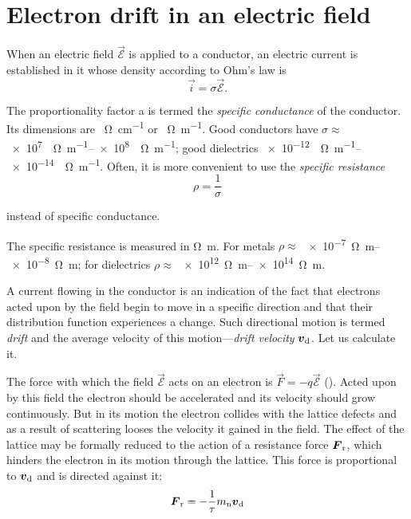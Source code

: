 \section{Electron drift in an electric field}\label{sec:48}

When an electric field $\vec{\mathcal{E}}$ is applied to a conductor, an electric current is established in it whose density according to Ohm's law is
\begin{equation}\label{eq:6_1}
    \vec{i} = \sigma \vec{\mathcal{E}}.
\end{equation}

\noindent
The proportionality factor a is termed the \textit{specific conductance} of the conductor. Its dimensions are \si{\per\ohm\per\centi\metre} or \si{\per\ohm\per\metre}. Good conductors have $\sigma\approx$ \SIrange{e7}{e8}{\per\ohm\per\metre}; good dielectrics \SIrange{e-12}{e-14}{\per\ohm\per\metre}. Often, it is more convenient to use the \textit{specific resistance}
\begin{equation}\label{eq:6_2}
    \rho = \frac{1}{\sigma}
\end{equation}

\noindent
instead of specific conductance.

The specific resistance is measured in \si{\ohm\metre}. For metals $\rho\approx$ \SIrange{e-7}{e-8}{\ohm\metre}; for dielectrics $\rho\approx$ \SIrange{e12}{e14}{\ohm\metre}.

A current flowing in the conductor is an indication of the fact that electrons acted upon by the field begin to move in a specific direction and that their distribution function experiences a change. Such directional motion is termed \textit{drift} and the average velocity of this
motion---\textit{drift velocity} $\boldsymbol{v}_{\text{d}}$. Let us calculate it.

The force with which the field $\vec{\mathcal{E}}$ acts on an electron is $\vec{F}=-q\vec{\mathcal{E}}$ (). Acted upon by this field the electron should be accelerated and its velocity should grow continuously. But in its motion the electron collides with the lattice defects and as a result of scattering
looses the velocity it gained in the field. The effect of the lattice may be formally reduced to the action of a resistance force $\boldsymbol{F}_{\text{r}}$, which hinders the electron in its motion through the lattice. This force is proportional to $\boldsymbol{v}_{\text{d}}$ and is directed against it:
\begin{equation}\label{eq:6_3}
    \boldsymbol{F}_{\text{r}} = - \frac{1}{\tau} m_{\text{n}} \boldsymbol{v}_{\text{d}}
\end{equation}

